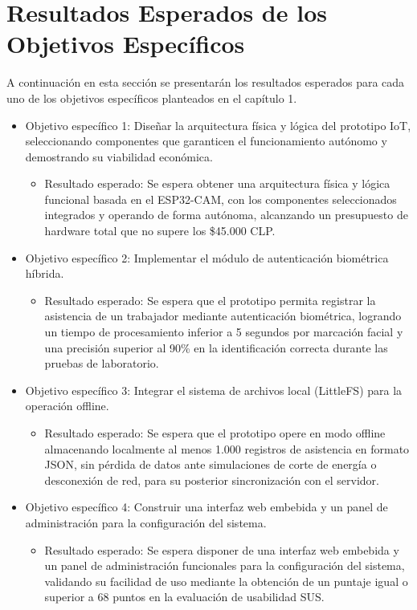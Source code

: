\documentclass{iccmemoria}
\begin{document}
\section{Resultados Esperados de los Objetivos Específicos}
A continuación en esta sección se presentarán los resultados esperados para cada uno de los objetivos específicos planteados en el capítulo 1.
\begin{itemize}
    \item Objetivo específico 1: Diseñar la arquitectura física y lógica del prototipo IoT, seleccionando componentes que garanticen el funcionamiento autónomo y demostrando su viabilidad económica.
    \begin{itemize}
        \item Resultado esperado: Se espera obtener una arquitectura física y lógica funcional basada en el ESP32-CAM, con los componentes seleccionados integrados y operando de forma autónoma, alcanzando un presupuesto de hardware total que no supere los \$45.000 CLP.
    \end{itemize}
    \item Objetivo específico 2: Implementar el módulo de autenticación biométrica híbrida.
    \begin{itemize}
        \item Resultado esperado: Se espera que el prototipo permita registrar la asistencia de un trabajador mediante autenticación biométrica, logrando un tiempo de procesamiento inferior a 5 segundos por marcación facial y una precisión superior al 90\% en la identificación correcta durante las pruebas de laboratorio.
    \end{itemize}
    \item Objetivo específico 3: Integrar el sistema de archivos local (LittleFS) para la operación offline.
    \begin{itemize}
        \item Resultado esperado: Se espera que el prototipo opere en modo offline almacenando localmente al menos 1.000 registros de asistencia en formato JSON, sin pérdida de datos ante simulaciones de corte de energía o desconexión de red, para su posterior sincronización con el servidor.
    \end{itemize}
    \item Objetivo específico 4: Construir una interfaz web embebida y un panel de administración para la configuración del sistema.
    \begin{itemize}
        \item Resultado esperado: Se espera disponer de una interfaz web embebida y un panel de administración funcionales para la configuración del sistema, validando su facilidad de uso mediante la obtención de un puntaje igual o superior a 68 puntos en la evaluación de usabilidad SUS.

\end{itemize}
\end{itemize}
\end{document}

